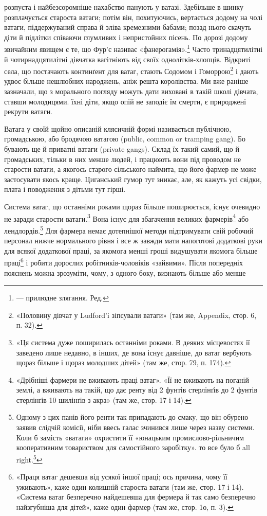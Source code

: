 \parcont{}  %
розпуста і найбезсоромніше нахабство панують у ватазі. Здебільше
в шинку розплачується староста ватаги; потім він, похитуючись,
вертається додому на чолі ватаги, піддержуваний справа
й зліва кремезними бабами; позад нього скачуть діти й підлітки
співаючи глумливих і непристойних пісень. По дорозі додому звичайним
явищем є те, що Фур’є називає «фанерогамія».\footnote*{
— прилюдне злягання. Ред.
} Часто тринадцятилітні
й чотирнадцятилітні дівчатка вагітніють від своїх
однолітків-хлопців. Відкриті села, що постачають континґент
для ватаг, стають Содомом і Гоморрою\footnote{
«Половину дівчат у Ludford’i зіпсували ватаги» (там же, Appendix,
стор. 6, п. 32).
} і дають удвоє більше
нешлюбних народжень, аніж решта королівства. Ми вже раніше
зазначали, що з морального погляду можуть дати виховані в
такій школі дівчата, ставши молодицями. їхні діти, якщо опій
не заподіє їм смерти, є природжені рекрути ватаги.

Ватага у своїй щойно описаній клясичній формі називається
публічною, громадською, або бродячою ватагою (public, common
or tramping gang). Бо бувають ще й приватні ватаги (private
gangs). Склад їх такий самий, що й громадських, тільки в них
менше людей, і працюють вони під проводом не старости ватаги,
а якогось старого сільського наймита, що його фармер не може
застосувати якось краще. Циганський гумор тут зникає, але, як
кажуть усі свідки, плата і поводження з дітьми тут гірші.

Система ватаг, що останніми роками щораз більше поширюється,
існує очевидно не заради старости ватаги.\footnote{
«Ця система дуже поширилась останніми роками. В деяких місцевостях
її заведено лише недавно, в інших, де вона існує давніше, до ватаг
вербують щораз більше і щораз молодших дітей» (там же, стор. 79,
п. 174).
} Вона існує
для збагачення великих фармерів\footnote{
«Дрібніші фармери не вживають праці ватаг». «Її не вживають
на поганій землі, а вживають на такій, що дає ренту від 2 фунтів стерлінґів
до 2 фунтів стерлінґів 10 шилінґів з акра» (там же, стор. 17 і 14).
} або лендлордів.\footnote{
Одному з цих панів його ренти так припадають до смаку, що він
обурено заявив слідчій комісії, ніби ввесь галас зчинився лише через
назву системи. Коли б замість «ватаги» охристити її «юнацьким промислово-рільничим
кооперативним товариством для самостійного заробітку».
то все було б all right.\footnote*{
— гаразд. Ред.
}
} Для фармера
немає дотепнішої методи підтримувати свій робочий персонал
нижче нормального рівня і все ж завжди мати напоготові
додаткові руки для всякої додаткової праці, за якомога менші
гроші видушувати якомога більше праці\footnote{
«Праця ватаг дешевша від усякої іншої праці; ось причина, чому
її уживають», каже один колишній староста ватаги (там же, стор. 17
і 14). «Система ватаг безперечно найдешевша для фермера й так само
безперечно найзгубніша для дітей», каже один фармер (там же, стор. 1о,
п. 3).
} і робити дорослих
робітників-чоловіків «зайвими». Після попередніх пояснень
можна зрозуміти, чому, з одного боку, визнають більше або менше
\parbreak{}  %
